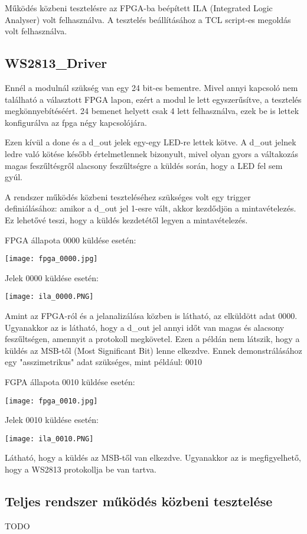 \tab Működés közbeni tesztelésre az FPGA-ba beépített ILA (Integrated Logic Analyser) volt felhasználva. A tesztelés beállításához a TCL script-es megoldás\cite{brassai2018ukda_ila} volt felhasználva.

\subsection{WS2813\_Driver}

\tab Ennél a modulnál szükség van egy 24 bit-es bementre. Mivel annyi kapcsoló nem található a választott FPGA lapon, ezért a modul le lett egyszerűsítve, a tesztelés megkönnyebítéséért. 
24 bemenet helyett csak 4 lett felhasználva, ezek be is lettek konfigurálva az fpga négy kapcsolójára.

\tab Ezen kívül a done és a d\_out jelek egy-egy LED-re lettek kötve. A d\_out jelnek ledre való kötése később értelmetlennek bizonyult, mivel olyan gyors a váltakozás magas feszűltésgről alacsony feszűltségre
a küldés során, hogy a LED fel sem gyúl.

\tab A rendszer működés közbeni teszteléséhez szükséges volt egy trigger definiálásához: amikor a d\_out jel 1-esre vált, akkor kezdődjön a mintavételezés. Ez lehetővé teszi, hogy a küldés kezdetétől legyen a mintavételezés.

\tab FPGA állapota 0000 küldése esetén:

\texttt{[image: fpga\_0000.jpg]}

\tab Jelek 0000 küldése esetén:

\texttt{[image: ila\_0000.PNG]}

\tab Amint az FPGA-ról és a jelanalizálása közben is látható, az elküldött adat 0000. Ugyanakkor az is látható, hogy a d\_out jel annyi időt van magas és alacsony feszűltségen, amennyit a protokoll megkövetel.
Ezen a példán nem látszik, hogy a küldés az MSB-től (Most Significant Bit) lenne elkezdve. Ennek demonstrálásához egy "asszimetrikus" adat szükséges, mint például: 0010

\tab FGPA állapota 0010 küldése esetén:

\texttt{[image: fpga\_0010.jpg]}

\tab Jelek 0010 küldése esetén:

\texttt{[image: ila\_0010.PNG]}

\tab Látható, hogy a küldés az MSB-től van elkezdve. Ugyanakkor az is megfigyelhető, hogy a WS2813 protokollja be van tartva.

\subsection{Teljes rendszer működés közbeni tesztelése}

TODO